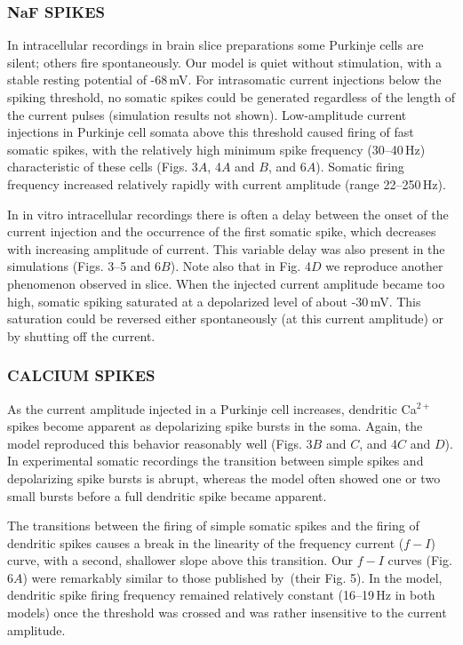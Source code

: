 \documentclass[12pt]{article}
\begin{document}
\subsubsection*{NaF SPIKES}

In intracellular recordings in brain slice preparations some Purkinje cells are silent; others fire spontaneously. Our model is quiet without stimulation, with a stable resting potential of -68\,mV. For intrasomatic current injections below the spiking threshold, no somatic spikes could be generated regardless of the length of the current pulses (simulation results not shown). Low-amplitude current injections in Purkinje cell somata above this threshold caused firing of fast somatic spikes, with the relatively high minimum spike frequency (30--40\,Hz) characteristic of these cells (Figs. 3$A$, 4$A$ and $B$, and 6$A$). Somatic firing frequency increased relatively rapidly with current amplitude (range 22--250\,Hz).

In in vitro intracellular recordings there is often a delay between the onset of the current injection and the occurrence of the first somatic spike, which decreases with increasing amplitude of current. This variable delay was also present in the simulations (Figs. 3--5 and 6$B$). Note also that in Fig. 4$D$ we reproduce another phenomenon observed in slice. When the injected current amplitude became too high, somatic spiking saturated at a depolarized level of about -30\,mV. This saturation could be reversed either spontaneously (at this current amplitude) or by shutting off the current.

\subsubsection*{CALCIUM SPIKES}

As the current amplitude injected in a Purkinje cell increases, dendritic Ca$^{2+}$ spikes become apparent as depolarizing spike bursts in the soma. Again, the model reproduced this behavior reasonably well (Figs. 3$B$ and $C$, and 4$C$ and $D$). In experimental somatic recordings the transition between simple spikes and depolarizing spike bursts is abrupt, whereas the model often showed one or two small bursts before a full dendritic spike became apparent.

The transitions between the firing of simple somatic spikes and the firing of dendritic spikes causes a break in the linearity of the frequency current ($f-I$) curve, with a second, shallower slope above this transition. Our $f-I$ curves (Fig. 6$A$) were remarkably similar to those published by\,\cite{R:1980ly} (their Fig. 5). In the model, dendritic spike firing frequency remained relatively constant (16--19\,Hz in both models) once the threshold was crossed and was rather insensitive to the current amplitude.
\end{document}
